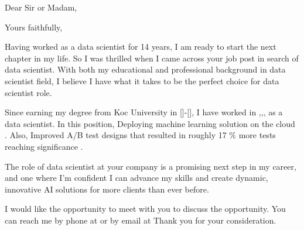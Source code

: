 \documentclass[11pt,a4paper,sans]{moderncv}        %
\begin{document}
\recipient{\quad}{\quad}
\date{March 06 2020}
\opening{Dear Sir or Madam,}
\closing{Yours faithfully,}
\makelettertitle


Having worked as a data scientist for 14 years, I am ready to start the next chapter in my life. So I was thrilled when I came across your job post in search of data scientist. With both my educational and professional background in data scientist field, I believe I have what it takes to be the perfect choice for data scientist role.



Since earning my degree from Koc University  in []-[], I have worked in ,,, as a data scientist. In this position, Deploying machine learning solution on the cloud . Also, Improved A/B test designs that resulted in roughly 17 \% more tests reaching significance . 

The role of data scientist at your company is a promising next step in my career, and one where I’m confident I can advance my skills and create dynamic, innovative AI solutions for more clients than ever before.


I would like the opportunity to meet with you to discuss the opportunity. You can reach me by phone at  or by email at 
Thank you for your consideration.


\makeletterclosing
\end{document}
